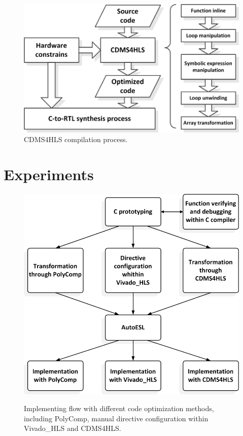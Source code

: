 \documentclass[10pt,twocolumn,letterpaper]{article}
\begin{document}
        \begin{figure}[t]
        \centering
        \includegraphics[width=0.8\linewidth]{CDMS4HLS.png}
        \caption{CDMS4HLS compilation process.}
        \label{CDMS4HLS}
        \end{figure}

\section{Experiments}
\label{sect:experiments}
\label{Comparison experiment}
    \begin{figure}
    \centering
    \includegraphics[width=0.8\linewidth]{Experiments.png}\\
    \caption{Implementing flow with different code optimization methods, including PolyComp, manual directive configuration within Vivado\_HLS and CDMS4HLS.}
    \label{Experiments}
    \end{figure}
\end{document}
